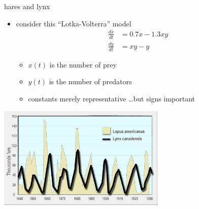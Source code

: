 \documentclass[urlcolor=blue,dvipsnames]{beamer}
\begin{document}
\begin{frame}{hares and lynx}

\begin{itemize}
\item consider this ``Lotka-Volterra'' model
\begin{align*}
\frac{dx}{dt} &= 0.7 x - 1.3 xy \\
\frac{dy}{dt} &= xy - y
\end{align*}

\vspace{-2mm}
    \begin{itemize}
    \item $x(t)$ is the number of prey
    \item $y(t)$ is the number of predators
    \item constants merely representative \dots but signs important
    \end{itemize}
\end{itemize}

\bigskip
\hfill \includegraphics[width=0.6\textwidth]{figs/hares-lynx}
\end{frame}
\end{document}
